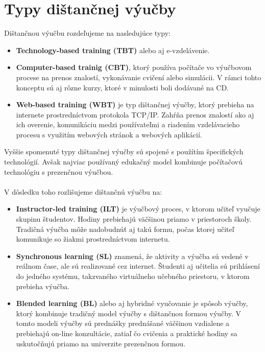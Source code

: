 \documentclass[10pt,oneside,slovak,a4paper]{article}
\begin{document}
\section{Typy dištančnej výučby}
\label{typy}
Dištančnou výučbu rozdeľujeme na nasledujúce typy\cite{WiktorzakKotowski}:
\begin{itemize}
	\item \textbf{Technology-based training (TBT)} alebo aj e-vzdelávenie. %
	\item \textbf{Computer-based trainig (CBT)}, ktorý používa počítače vo výučbovom procese na prenos znalostí, vykonávanie cvičení alebo simulácii. V rámci tohto konceptu sú aj rôzne kurzy, ktoré v minulosti boli dodávané na CD.
	\item \textbf{Web-based training (WBT)} je typ dištančnej výučby, ktorý prebieha na internete prostredníctvom protokola TCP/IP. Zahŕňa prenos znalostí ako aj ich overenie, komunikáciu medzi používateľmi a riadením vzdelávacieho procesu s využitím webových stránok a webových aplikácií.
\end{itemize}

Vyššie spomenuté typy dištančnej výučby sú spojené s použítím špecifických technológií. 
Avšak najviac používaný edukačný model kombinuje počítačovú technológiu s prezenčnou výučbou.\\\\%

V dôsledku toho rozlišujeme dištančnú výučbu na:
\begin{itemize}
	\item \textbf{Instructor-led training (ILT)} je výučbový proces, v ktorom učiteľ vyučuje skupinu študentov. Hodiny prebiehajú väčšinou priamo v priestoroch školy. Tradičná výučba môže nadobudnúť aj takú formu, počas ktorej učiteľ komunikuje so žiakmi prostredníctvom internetu.
	\item \textbf{Synchronous learning (SL)} znamená, že aktivity a výučba sú vedené v reálnom čase, ale sú realizované cez internet. Študenti aj učitelia sú prihlásení do jedného systému, takzvaného virtuálneho učebného priestoru, v ktorom prebieha výučba.
	\item \textbf{Blended learning (BL)} alebo aj hybridné vyučovanie je spôsob výučby, ktorý kombinuje tradičný model výučby s dištančnou formou výučby. V tomto modeli výučby sú prednášky prednášané väčšinou vzdialene a prebiehajú on-line konzultácie, zatiaľ čo cvičenia a praktické hodiny sa uskutočňujú priamo na univerzite prezenčnou formou.
\end{itemize}
\end{document}
